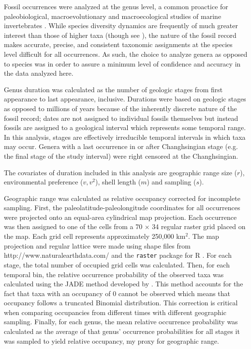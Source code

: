\documentclass[11pt]{article}
\begin{document}
Fossil occurrences were analyzed at the genus level, a common proactice for paleobiological, macroevolutionary and macroecological studies of marine invertebrates \citep{Alroy2010,Foote2013,Harnik2013,Kiessling2007a,Miller2009a,Nurnberg2013a,Nurnberg2015,Payne2007,Ritterbush2017,Simpson2009,Vilhena2013}. While species diversity dynamics are frequently of much greater interest than those of higher taxa (though see \citealt{Foote2014b,Hoehn2015}), the nature of the fossil record makes accurate, precise, and consistent taxonomic assignments at the species level difficult for all occurrences. As such, the choice to analyze genera as opposed to species was in order to assure a minimum level of confidence and accuracy in the data analyzed here.

Genus duration was calculated as the number of geologic stages from first appearance to last appearance, inclusive. Durations were based on geologic stages as opposed to millions of years because of the inherently discrete nature of the fossil record; dates are not assigned to individual fossils themselves but instead fossils are assigned to a geological interval which represents some temporal range. In this analysis, stages are effectively irreducible temporal intervals in which taxa may occur. Genera with a last occurrence in or after Changhsingian stage (e.g. the final stage of the study interval) were right censored at the Changhsingian. 

The covariates of duration included in this analysis are geographic range size (\(r\)), environmental preference (\(v, v^{2}\)), shell length (\(m\)) and sampling (\(s\)).

Geographic range was calculated as relative occupancy corrected for incomplete sampling. First, the paleolatitude-paleolongitude coordinates for all occurrences were projected onto an equal-area cylindrical map projection. Each occurrence was then assigned to one of the cells from a 70 \(\times\) 34 regular raster grid placed on the map. Each grid cell represents approximately 250,000 km\(^{2}\). The map projection and regular lattice were made using shape files from http://www.naturalearthdata.com/ and the \texttt{raster} package for R \citep{raster}. For each stage, the total number of occupied grid cells was calculated. Then, for each temporal bin, the relative occurrence probability of the observed taxa was calculated using the \uppercase{jade} method developed by \citet{Chao2015a}. This method accounts for the fact that taxa with an occupancy of 0 cannot be observed which means that occupancy follows a truncated Binomial distribution. This correction is critical when comparing occupancies from different times with different geographic sampling. Finally, for each genus, the mean relative occurrence probability was calculated as the average of that genus' occurrence probabilities for all stages it was sampled to yield relative occupancy, my proxy for geographic range.
\end{document}
